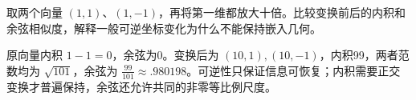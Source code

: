 \begin{exercises}
\begin{exercise} 取两个向量 $(1,1)$、$(1,-1)$，再将第一维都放大十倍。比较变换前后的内积和余弦相似度，解释一般可逆坐标变化为什么不能保持嵌入几何。

\begin{solution}
原向量内积 $1-1=0$，余弦为0。变换后为 $(10,1),(10,-1)$，内积99，两者范数均为 $\sqrt{101}$，余弦为 $\frac{99}{101}\approx.980198$。可逆性只保证信息可恢复；内积需要正交变换才普遍保持，余弦还允许共同的非零等比例尺度。
\end{solution}
\end{exercise}

\end{exercises}
